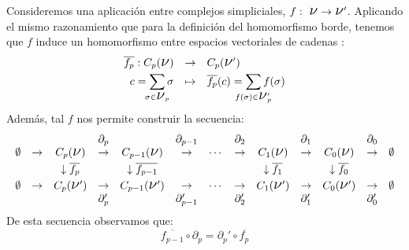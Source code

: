 \documentclass[12pt, a4paper, twoside]{book}
\numberwithin{equation}{section}
\theoremstyle{definition}
\theoremstyle{remark}
\theoremstyle{plain}
\begin{document}
	Consideremos una aplicación entre complejos simpliciales, $f:\text{
	{\Large $\nu$}}\rightarrow\text{{\Large $\nu$}}'$. Aplicando el mismo 
	razonamiento que para la definición del homomorfismo borde, tenemos 
	que $f$ induce un homomorfismo entre espacios vectoriales de cadenas :
	\begin{equation}
		\label{hom:induc}
		\left.
		\begin{array}{lll}
			\overline{f_{p}}:C_{p}(\text{{\Large $\nu$}}) & 
				\rightarrow & C_{p}(\text{{\Large $\nu$}}')
				\\[3pt] 
			\multicolumn{1}{r}{c=\displaystyle \sum_{\mathclap{
			\sigma \in \text{{\Large $\nu$}$_{p}$}}}\sigma} & 
			\mapsto & 
			\overline{f_{p}}(c)=\displaystyle \sum_{\mathclap{
			f(\sigma) \in \text{{\Large $\nu$}$_{p}'$}}}f(\sigma)
		\end{array}
		\right. 
	\end{equation}
	Además, tal $f$ nos permite construir la secuencia:
	\begin{equation}
		\label{hom: gruphom}
		 \left.
		\begin{array}{ccccccccccccc}
			 & & & \partial_{p} &  & 
			\partial_{p-1} &  & \partial_{2}&  & \partial_{1}&  & 
			\partial_{0} & \\ 
			\emptyset & \rightarrow & C_{p}(
			\text{{\Large $\nu$}}) & \rightarrow & C_{p-1}(
			\text{{\Large $\nu$}}) & \rightarrow &\cdots & 
			\rightarrow & C_{1}(
			\text{{\Large $\nu$}})& \rightarrow & C_{0}(
			\text{{\Large $\nu$}})& \rightarrow & \emptyset\\[3pt]

			 & & \downarrow \overline{f_{p}}& & \downarrow 
			\overline{f_{p-1}}& 
			 & & & \downarrow \overline{f_{1}}
			 & & \downarrow \overline{f_{0}} & & \\ [3pt]
			\emptyset & \rightarrow & C_{p}(
			\text{{\Large $\nu$}}') & \rightarrow & C_{p-1}(
			\text{{\Large $\nu$}}') & \rightarrow &\cdots & 
			\rightarrow & C_{1}(
			\text{{\Large $\nu$}}')& \rightarrow & C_{0}(
			\text{{\Large $\nu$}}')& \rightarrow & \emptyset \\
			 & & & \partial_{p}' &  & 
			\partial_{p-1}' &  & \partial_{2}' &  & \partial_{1}'&
					& \partial_{0}' &
		\end{array}
		\right. 
	\end{equation}
	De esta secuencia observamos que: 
	\begin{equation*}
		\overline{f_{p-1}}\circ\partial_{p}=
		\partial_{p}'\circ\overline{f_{p}} 
	\end{equation*}
\end{document}

